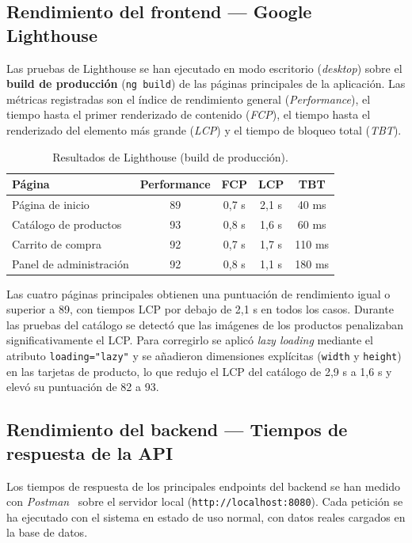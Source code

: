 \subsection{Rendimiento del frontend — Google Lighthouse}

Las pruebas de Lighthouse se han ejecutado en modo escritorio (\textit{desktop}) sobre el \textbf{build de producción} (\texttt{ng build}) de las páginas principales de la aplicación. Las métricas registradas son el índice de rendimiento general (\textit{Performance}), el tiempo hasta el primer renderizado de contenido (\textit{FCP}), el tiempo hasta el renderizado del elemento más grande (\textit{LCP}) y el tiempo de bloqueo total (\textit{TBT}).

\begin{table}[H]
\centering
\small
\begin{tabular}{|l|c|c|c|c|}
\hline
\textbf{Página} & \textbf{Performance} & \textbf{FCP} & \textbf{LCP} & \textbf{TBT} \\
\hline
Página de inicio      & 89 & 0,7 s & 2,1 s & 40 ms \\
\hline
Catálogo de productos & 93 & 0,8 s & 1,6 s & 60 ms \\
\hline
Carrito de compra     & 92 & 0,7 s & 1,7 s & 110 ms \\
\hline
Panel de administración & 92 & 0,8 s & 1,1 s & 180 ms \\
\hline
\end{tabular}
\caption{Resultados de Lighthouse (build de producción).}
\end{table}

Las cuatro páginas principales obtienen una puntuación de rendimiento igual o superior a 89, con tiempos LCP por debajo de 2,1 s en todos los casos. Durante las pruebas del catálogo se detectó que las imágenes de los productos penalizaban significativamente el LCP. Para corregirlo se aplicó \textit{lazy loading} mediante el atributo \texttt{loading="lazy"} y se añadieron dimensiones explícitas (\texttt{width} y \texttt{height}) en las tarjetas de producto, lo que redujo el LCP del catálogo de 2,9 s a 1,6 s y elevó su puntuación de 82 a 93.

\subsection{Rendimiento del backend — Tiempos de respuesta de la API}

Los tiempos de respuesta de los principales endpoints del backend se han medido con \textit{Postman}~\cite{postmanDocs} sobre el servidor local (\texttt{http://localhost:8080}). Cada petición se ha ejecutado con el sistema en estado de uso normal, con datos reales cargados en la base de datos.

